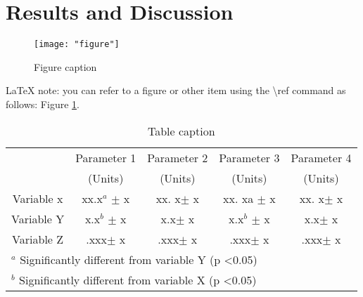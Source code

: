 \documentclass[../main.tex]{subfiles}
\begin{document}
\section{Results and Discussion}

\lipsum[5]

\begin{figure}[htbp]
\centering
\texttt{[image: "figure"]}
\caption{Figure caption}
\label{figure label}
\end{figure}

{\LaTeX} note: you can refer to a figure or other item using the \textbackslash ref command as follows: Figure \ref{figure label}.

\bgroup
\def\arraystretch{1}
\begin{table}[htbp]
\caption{Table caption}
\begin{center}
\begin{tabular}{c c c c c}
\hline
&Parameter 1&Parameter 2&Parameter 3&Parameter 4 \\
&(Units)&(Units)&(Units)&(Units) \\ \hline
Variable x& xx.x$^a$ $\pm$ x& xx. x$\pm$ x&xx. xa $\pm$ x& xx. x$\pm$ x\\
Variable Y & x.x$^b$ $\pm$ x& x.x$\pm$ x& x.x$^b$ $\pm$ x& x.x$\pm$ x\\
Variable Z & .xxx$\pm$ x& .xxx$\pm$ x& .xxx$\pm$ x& .xxx$\pm$ x\\ \hline
\multicolumn{5}{l}{$^a$ Significantly different from variable Y (p \textless 0.05)} \\
\multicolumn{5}{l}{$^b$ Significantly different from variable X (p \textless 0.05)} \\ \hline
\end{tabular}
\end{center}
\label{table example}
\end{table}
\egroup
\end{document}
